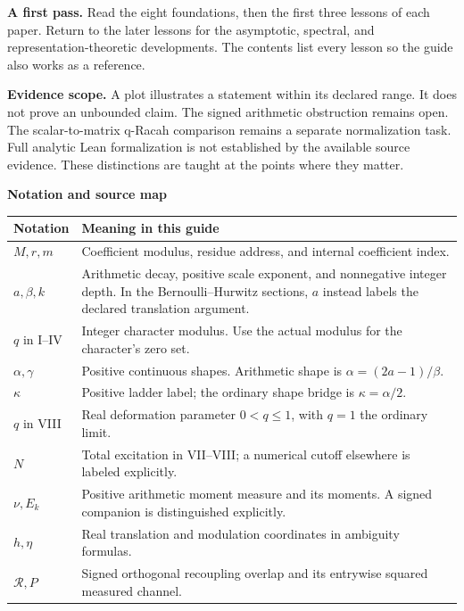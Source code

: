 \documentclass[11pt]{article}
\begin{document}
\vspace{0.18in}
\textbf{A first pass.} Read the eight foundations, then the first three lessons of each paper. Return to the later lessons for the asymptotic, spectral, and representation-theoretic developments. The contents list every lesson so the guide also works as a reference.

\textbf{Evidence scope.} A plot illustrates a statement within its declared range. It does not prove an unbounded claim. The signed arithmetic obstruction remains open. The scalar-to-matrix q-Racah comparison remains a separate normalization task. Full analytic Lean formalization is not established by the available source evidence. These distinctions are taught at the points where they matter.

\clearpage
{}
{\small\tableofcontents}
\clearpage
{}












\clearpage
{}
{\LARGE\bfseries Notation and source map\par}
\vspace{0.15in}
\begin{tabular}{>{\raggedright\arraybackslash}p{1.3in}>{\raggedright\arraybackslash}p{5.05in}}
\toprule
Notation & Meaning in this guide\\
\midrule
$M,r,m$ & Coefficient modulus, residue address, and internal coefficient index.\\[0.08in]
$a,\beta,k$ & Arithmetic decay, positive scale exponent, and nonnegative integer depth. In the Bernoulli--Hurwitz sections, $a$ instead labels the declared translation argument.\\[0.08in]
$q$ in I--IV & Integer character modulus. Use the actual modulus for the character's zero set.\\[0.08in]
$\alpha,\gamma$ & Positive continuous shapes. Arithmetic shape is $\alpha=(2a-1)/\beta$.\\[0.08in]
$\kappa$ & Positive ladder label; the ordinary shape bridge is $\kappa=\alpha/2$.\\[0.08in]
$q$ in VIII & Real deformation parameter $0<q\le1$, with $q=1$ the ordinary limit.\\[0.08in]
$N$ & Total excitation in VII--VIII; a numerical cutoff elsewhere is labeled explicitly.\\[0.08in]
$\nu,E_k$ & Positive arithmetic moment measure and its moments. A signed companion is distinguished explicitly.\\[0.08in]
$h,\eta$ & Real translation and modulation coordinates in ambiguity formulas.\\[0.08in]
$\mathcal R,P$ & Signed orthogonal recoupling overlap and its entrywise squared measured channel.\\
\bottomrule
\end{tabular}\par
\end{document}
